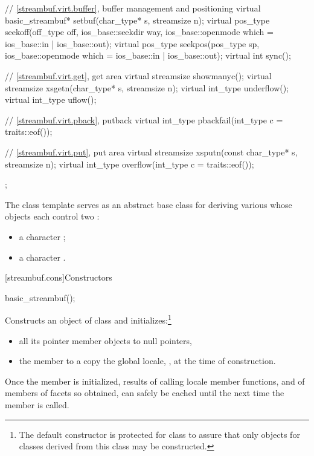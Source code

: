 \begin{codeblock}
{{    // \ref{streambuf.virt.buffer}, buffer management and positioning
    virtual basic_streambuf* setbuf(char_type* s, streamsize n);
    virtual pos_type seekoff(off_type off, ios_base::seekdir way,
                             ios_base::openmode which
                               = ios_base::in | ios_base::out);
    virtual pos_type seekpos(pos_type sp,
                             ios_base::openmode which
                               = ios_base::in | ios_base::out);
    virtual int      sync();

    // \ref{streambuf.virt.get}, get area
    virtual streamsize showmanyc();
    virtual streamsize xsgetn(char_type* s, streamsize n);
    virtual int_type   underflow();
    virtual int_type   uflow();

    // \ref{streambuf.virt.pback}, putback
    virtual int_type   pbackfail(int_type c = traits::eof());

    // \ref{streambuf.virt.put}, put area
    virtual streamsize xsputn(const char_type* s, streamsize n);
    virtual int_type   overflow(int_type c = traits::eof());
  };
}
\end{codeblock}

\pnum
The class template
serves as an abstract base class for deriving various
whose objects each control two
:
\begin{itemize}
\item
a character
;
\item
a character
.
\end{itemize}

[streambuf.cons]{Constructors}

%
\begin{itemdecl}
basic_streambuf();
\end{itemdecl}

\begin{itemdescr}
\pnum
\effects
Constructs an object of class
and initializes:\footnote{The default constructor is protected for class
to assure that only objects for classes
derived from this class may be constructed.}
\begin{itemize}
\item
all its pointer member objects to null pointers,
\item
the
member to a copy the global locale,
,
at the time of construction.
\end{itemize}

\pnum
\remarks
Once the
member is initialized, results of calling locale member functions,
and of members of facets so obtained, can safely be cached until the
next time the member
is called.
\end{itemdescr}


